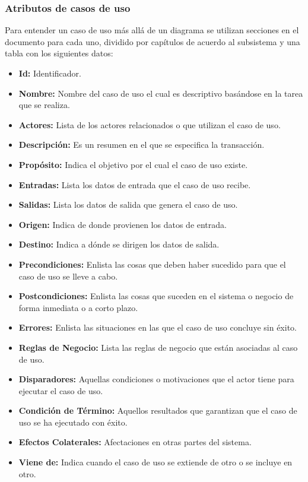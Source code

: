 %

\subsubsection{Atributos de casos de uso}

Para entender un caso de uso más allá de un diagrama se utilizan secciones 
en el documento para cada uno, dividido por capítulos de acuerdo al subsistema y 
una tabla con los siguientes datos:

\begin{itemize}
	\item \textbf{Id:} Identificador.
	\item \textbf{Nombre:} Nombre del caso de uso el cual es descriptivo 
	basándose en la tarea que se realiza.
	\item \textbf{Actores:} Lista de los actores relacionados o que utilizan 
	el caso de uso.
	\item \textbf{Descripción:} Es un resumen en el que se especifica la 
	transacción.
	\item \textbf{Propósito:} Indica el objetivo por el cual el caso de uso 
	existe.
	\item \textbf{Entradas:} Lista los datos de entrada que el caso de uso 
	recibe.
	\item \textbf{Salidas:} Lista los datos de salida que genera el caso de 
	uso.
	\item \textbf{Origen:} Indica de donde provienen los datos de entrada.
	\item \textbf{Destino:} Indica a dónde se dirigen los datos de salida.
	\item \textbf{Precondiciones:} Enlista las cosas que deben haber 
	sucedido para que el caso de uso se lleve a cabo.
	\item \textbf{Postcondiciones:} Enlista las cosas que suceden en el 
	sistema o negocio de forma inmediata o a corto plazo.
	\item \textbf{Errores:} Enlista las situaciones en las que el caso de 
	uso concluye sin éxito.
	\item \textbf{Reglas de Negocio:} Lista las reglas de negocio que están 
	asociadas al caso de uso.
	\item \textbf{Disparadores:} Aquellas condiciones o motivaciones que el 
	actor tiene para ejecutar el caso de uso.
	\item \textbf{Condición de Término:} Aquellos resultados que garantizan 
	que el caso de uso se ha ejecutado con éxito.
	\item \textbf{Efectos Colaterales:} Afectaciones en otras partes del 
	sistema.
	\item \textbf{Viene de:} Indica cuando el caso de uso se extiende de 
	otro o se incluye en otro.
\end{itemize}
